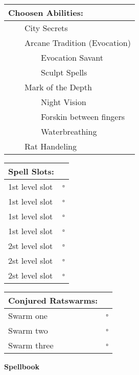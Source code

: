 \documentclass[11pt]{article}
\newcommand{\available}{$\square$}
\newcommand{\tabitem}{~~\llap{--}~~}
\newcommand{\tabtabitem}{~~~~~~\llap{$\bullet$}~~}
\begin{document}
\begin{multicols}{2}
\vspace{4mm}

\noindent \begin{tabularx}{95mm}{@{}l}
{\Large \textbf{Choosen Abilities:}} \\
\hline
\tabitem City Secrets \\
\tabitem Arcane Tradition (Evocation) \\
\tabtabitem Evocation Savant \\
\tabtabitem Sculpt Spells \\
\tabitem Mark of the Depth \\
\tabtabitem Night Vision \\
\tabtabitem Forskin between fingers \\
\tabtabitem Waterbreathing \\
\tabitem Rat Handeling
		\end{tabularx}

\vspace{4mm}

\noindent \begin{tabularx}{95mm}{@{}l c}
{\Large \textbf{Spell Slots:}} & \\
\hline
1st level slot & \available \\
1st level slot & \available \\
1st level slot & \available \\
1st level slot & \available \\
2st level slot & \available \\
2st level slot & \available \\
2st level slot & \available
		\end{tabularx}

\vspace{4mm}

\noindent \begin{tabularx}{95mm}{@{}l c}
{\Large \textbf{Conjured Ratswarms:}} & \\
\hline
Swarm one & \available \\
Swarm two & \available \\
Swarm three & \available
		\end{tabularx}
	\end{multicols}

\clearpage

	\begin{center}
{\LARGE \textbf{Spellbook}}
	\end{center}
\end{document}
